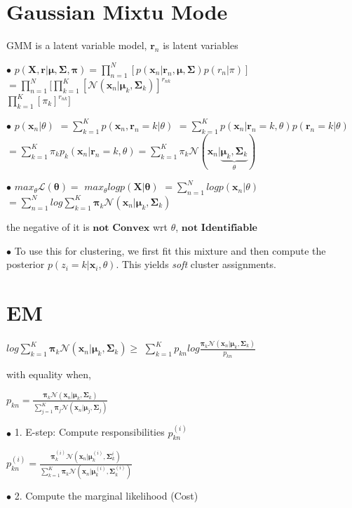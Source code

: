 \documentclass[10pt,a4paper,landscape]{article}
\renewcommand{\bf}[1]{\ensuremath{\mathbf{#1}}}
\begin{document}
\begin{multicols*}{6}
\section{Gaussian Mixtu Mode}
GMM is a latent variable model, $\bf{r}_n$ is latent variables

$\bullet$ $p(\bf{X,r} | \bf{\mu},\bf{\Sigma}, \bf{\pi}) = \prod_{n=1}^N [p(\bf{x}_n|\bf{r}_n,\bf{\mu},\bf{\Sigma})p(r_n | \pi)]$ $= \prod_{n=1}^N [\prod_{k=1}^K [\mathcal{N}(\bf{x}_n|\bf{\mu}_k,\bf{\Sigma}_k)]^{r_{nk}}$\\
$ \prod_{k=1}^K [\pi_k]^{r_{nk}}]$

$\bullet$ $p(\bf{x}_n | \theta)$ 
$= \sum_{k=1}^K p(\bf{x}_n, \bf{r}_n=k | \theta) $
$= \sum_{k=1}^K p(\bf{x}_n | \bf{r}_n=k,\theta)p(\bf{r}_n=k | \theta)$
$= \sum_{k=1}^K \pi_k p_{k}(\bf{x}_n |\bf{r}_n=k, \theta) =  \sum_{k=1}^K \pi_k \mathcal{N}(\bf{x}_n | \underbrace{\bf{\mu}_k, \bf{\Sigma}_k}_{\theta})$

$\bullet$ $max_{\theta} \mathcal{L}(\bf{\theta})=$ $max_{\theta} log p(\bf{X} | \bf{\theta})$
$= \sum_{n=1}^N log p(\bf{x}_n | \theta)$
$= \sum_{n=1}^N log \sum_{k=1}^K \bf{\pi}_k \mathcal{N}(\bf{x}_n | \bf{\mu}_k, \bf{\Sigma}_k)$

the negative of it is $\bf{not}$ $\bf{Convex}$ wrt $\theta$, $\bf{not}$ $\bf{Identifiable}$

$\bullet$ To use this for clustering, we first fit this mixture and then compute the posterior $p(z_i = k | \bf{x}_i, \theta)$. This yields \textit{soft} cluster assignments.

\section{EM}
$log \sum_{k=1}^K\bf{\pi}_k\mathcal{N}(\bf{x}_n|\bf{\mu}_k,\bf{\Sigma}_k)\geq$ $\sum_{k=1}^Kp_{kn} log\frac{\bf{\pi}_k\mathcal{N}(\bf{x}_n|\bf{\mu}_k,\bf{\Sigma}_k)}{p_{kn}}$

with equality when, 

$p_{kn}=\frac{\bf{\pi}_k\mathcal{N}(\bf{x}_n|\bf{\mu}_k,\bf{\Sigma}_k)}{\sum_{j=1}^K\bf{\pi}_j\mathcal{N}(\bf{x}_n|\bf{\mu}_j,\bf{\Sigma}_j)}$

$\bullet$ 1. E-step: Compute responsibilities $p_{kn}^{(i)}$ 

$p_{kn}^{(i)}= \frac{\bf{\pi}_k^{(i)} \mathcal{N}(\bf{x}_n | \bf{\mu}_k^{(i)}, \bf{\Sigma}_k^{i})}{\sum_{k=1}^K \bf{\pi}_k \mathcal{N}(\bf{x}_n|\bf{\mu}_k^{(i)}, \bf{\Sigma}_k^{(i)}) }$  

$\bullet$ 2. Compute the marginal likelihood (Cost)


\end{multicols*}
\end{document}
